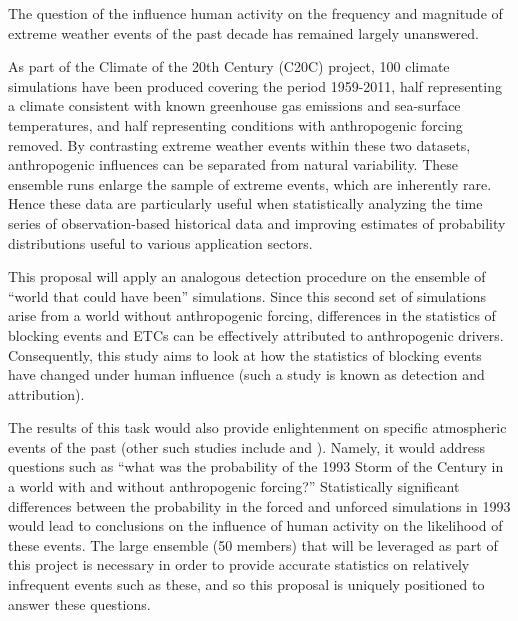 \documentclass[11pt]{article}
\begin{document}
The question of the influence human activity on the frequency and magnitude of extreme weather events of the past decade has remained largely unanswered.

As part of the Climate of the 20th Century (C20C) project, 100 climate simulations have been produced covering the period 1959-2011, half representing a climate consistent with known greenhouse gas emissions and sea-surface temperatures, and half representing conditions with anthropogenic forcing removed.  By contrasting extreme weather events within these two datasets, anthropogenic influences can be separated from natural variability. These ensemble runs enlarge the sample of extreme events, which are inherently rare. Hence these data are particularly useful when statistically analyzing the time series of observation-based historical data and improving estimates of probability distributions useful to various application sectors.

This proposal will apply an analogous detection procedure on the ensemble of ``world that could have been'' simulations.  Since this second set of simulations arise from a world without anthropogenic forcing, differences in the statistics of blocking events and ETCs can be effectively attributed to anthropogenic drivers.  Consequently, this study aims to look at how the statistics of blocking events have changed under human influence (such a study is known as detection and attribution).

The results of this task would also provide enlightenment on specific atmospheric events of the past (other such studies include \cite{stott2004human} and \cite{pall2011anthropogenic}).  Namely, it would address questions such as ``what was the probability of the 1993 Storm of the Century in a world with and without anthropogenic forcing?''  Statistically significant differences between the probability in the forced and unforced simulations in 1993 would lead to conclusions on the influence of human activity on the likelihood of these events.  The large ensemble (50 members) that will be leveraged as part of this project is necessary in order to provide accurate statistics on relatively infrequent events such as these, and so this proposal is uniquely positioned to answer these questions.

\end{document}
